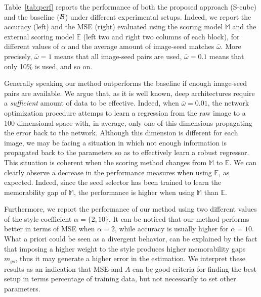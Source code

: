 \documentclass{sig-alternate-05-2015}
\begin{document}
Table~\ref{tab:perf} reports the performance of both the proposed approach (S-cube) and the baseline (${\cal B}$) under different experimental setups. Indeed, we report the accuracy (left) and the MSE (right) evaluated using the scoring model $\mathbb{M}$ and the external scoring model 
$\mathbb{E}$ (left two and right two columns of each block), for different values of $\alpha$ and the average amount of image-seed matches $\bar{\omega}$. More precisely, $\bar{\omega}=1$ means that all image-seed pairs are used, $\bar{\omega}=0.1$ means that only 10\% is used, and 
so on.

Generally speaking our method outperforms the baseline if enough image-seed pairs are available. We argue that, as it is well known, deep architectures require a \textit{sufficient} amount of data to be effective. Indeed, when $\bar{\omega}=0.01$, the network optimization procedure attemps to learn a regression from the raw image to a 100-dimensional space with, in average, only one of this dimensions propagating the 
error back to the network. Although this dimension is different for each image, we may be facing a situation in which not enough information is 
propagated back to the parameters so as to effectively learn a robust regressor. This situation is coherent when the scoring method changes from 
$\mathbb{M}$ to $\mathbb{E}$. We can clearly observe a decrease in the performance measures when using $\mathbb{E}$, as expected. Indeed, since the 
seed selector has been trained to learn the memorability gap of $\mathbb{M}$, the performance is higher when using $\mathbb{M}$ than $\mathbb{E}$.


Furthermore, we report the performance of our method using two different values of the style coefficient $\alpha=\{2,10\}$. It can be noticed that 
our method performs better in terms of MSE when $\alpha=2$, while accuracy is usually higher for $\alpha=10$. What a priori could be 
seen as a divergent behavior, can be explained by the fact that imposing a higher weight to the style produces higher memorability gaps $m_{gs}$, 
thus it may generate a higher error in the estimation. %
We interpret these  results as an indication that MSE and $A$ can be good criteria for finding the best setup in terms percentage of training data, but not necessarily to 
set other parameters.%
\end{document}
